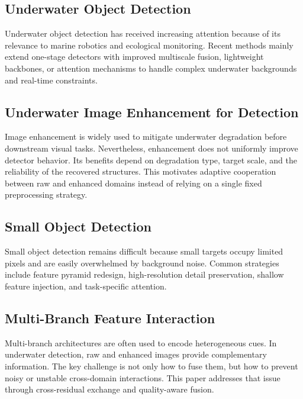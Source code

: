 \subsection*{Underwater Object Detection}
Underwater object detection has received increasing attention because of its relevance to
marine robotics and ecological monitoring. Recent methods mainly extend one-stage detectors
with improved multiscale fusion, lightweight backbones, or attention mechanisms to handle
complex underwater backgrounds and real-time constraints.

\subsection*{Underwater Image Enhancement for Detection}
Image enhancement is widely used to mitigate underwater degradation before downstream visual
tasks. Nevertheless, enhancement does not uniformly improve detector behavior. Its benefits
depend on degradation type, target scale, and the reliability of the recovered structures.
This motivates adaptive cooperation between raw and enhanced domains instead of relying on a
single fixed preprocessing strategy.

\subsection*{Small Object Detection}
Small object detection remains difficult because small targets occupy limited pixels and are
easily overwhelmed by background noise. Common strategies include feature pyramid redesign,
high-resolution detail preservation, shallow feature injection, and task-specific attention.

\subsection*{Multi-Branch Feature Interaction}
Multi-branch architectures are often used to encode heterogeneous cues. In underwater
detection, raw and enhanced images provide complementary information. The key challenge is
not only how to fuse them, but how to prevent noisy or unstable cross-domain interactions.
This paper addresses that issue through cross-residual exchange and quality-aware fusion.
